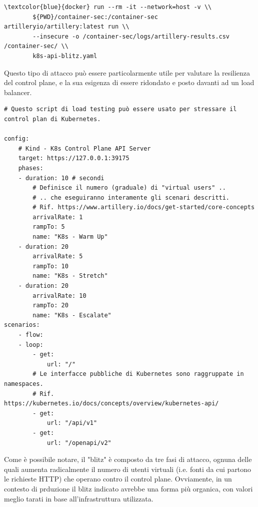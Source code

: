 \begin{small}
\begin{Verbatim}[commandchars=\\\{\}]
    \textcolor{blue}{docker} run --rm -it --network=host -v \\
        ${PWD}/container-sec:/container-sec artilleryio/artillery:latest run \\
        --insecure -o /container-sec/logs/artillery-results.csv /container-sec/ \\
        k8s-api-blitz.yaml
\end{Verbatim}
\end{small}

Questo tipo di attacco può essere particolarmente utile per valutare la resilienza del control plane, e la sua esigenza di essere ridondato e posto davanti ad un load balancer.

\begin{code}
\label{code:apx:a:yaml}
\begin{verbatim}
# Questo script di load testing può essere usato per stressare il control plan di Kubernetes.

config:
    # Kind - K8s Control Plane API Server
    target: https://127.0.0.1:39175
    phases:
    - duration: 10 # secondi
        # Definisce il numero (graduale) di "virtual users" .. 
        # .. che eseguiranno interamente gli scenari descritti.
        # Rif. https://www.artillery.io/docs/get-started/core-concepts
        arrivalRate: 1
        rampTo: 5
        name: "K8s - Warm Up"
    - duration: 20
        arrivalRate: 5
        rampTo: 10
        name: "K8s - Stretch"
    - duration: 20
        arrivalRate: 10
        rampTo: 20
        name: "K8s - Escalate"
scenarios:
    - flow:
    - loop:
        - get:
            url: "/"
        # Le interfacce pubbliche di Kubernetes sono raggruppate in namespaces.
        # Rif. https://kubernetes.io/docs/concepts/overview/kubernetes-api/
        - get:
            url: "/api/v1"
        - get:
            url: "/openapi/v2"
\end{verbatim}
\end{code}

Come è possibile notare, il "blitz" è composto da tre fasi di attacco, ognuna delle quali aumenta radicalmente il numero di utenti virtuali (i.e. fonti da cui partono le richieste HTTP) che operano contro il control plane. Ovviamente, in un contesto di prduzione il blitz indicato avrebbe una forma più organica, con valori meglio tarati in base all'infrastruttura utilizzata.

